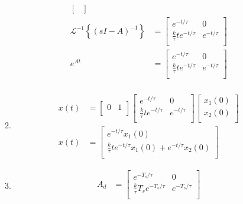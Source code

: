 \documentclass[12pt]{article}
\begin{document}
\begin{enumerate}
\begin{enumerate}
\begin{align*}
\begin{bmatrix}
        \end{bmatrix} \\
        \mathcal{L}^{-1}\left\{(sI-A)^{-1}\right\} &= \begin{bmatrix}
            e^{-t/\tau} & 0 \\
            \frac{k}{\tau} t e^{-t/\tau} & e^{-t/\tau} \\
        \end{bmatrix} \\
        e^{At} &= \begin{bmatrix}
            e^{-t/\tau} & 0 \\
            \frac{k}{\tau} t e^{-t/\tau} & e^{-t/\tau} \\
        \end{bmatrix} \\
    \end{align*}
    \item 
    \begin{align*}
        x(t) &= \begin{bmatrix}
            0 & 1 \\
        \end{bmatrix} \begin{bmatrix}
            e^{-t/\tau} & 0 \\
            \frac{k}{\tau} t e^{-t/\tau} & e^{-t/\tau} \\
        \end{bmatrix} \begin{bmatrix}
            x_1(0) \\
            x_2(0) \\
        \end{bmatrix} \\
        x(t) &= \begin{bmatrix}
            e^{-t/\tau} x_1(0) \\
            \frac{k}{\tau} t e^{-t/\tau} x_1(0) + e^{-t/\tau} x_2(0) \\
        \end{bmatrix}
    \end{align*}
    \item 
    \begin{align*}
        A_d &= \begin{bmatrix}
            e^{-T_s/\tau} & 0 \\
            \frac{k}{\tau} T_s e^{-T_s/\tau} & e^{-T_s/\tau} \\
        \end{bmatrix} \\

\end{align*}
\end{enumerate}
\end{enumerate}
\end{document}
